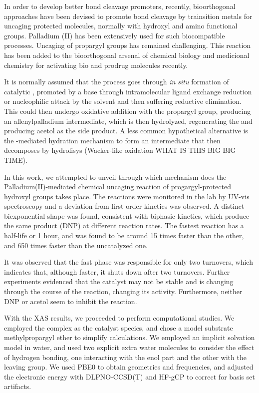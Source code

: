 In order to develop better  bond cleavage promoters,
recently, bioorthogonal approaches have been devised to promote  bond
cleavage by trainsition metals for uncaging protected molecules, normally with
hydroxyl and amino functional groups.
Palladium (II) has been extensively used for such biocompatible processes.
Uncaging of propargyl groups has remained challenging.
This reaction has been added to the bioorthogonal arsenal of chemical biology and
medicional chemistry for activating bio and prodrug molecules recently.

It is normally assumed that the process goes through \emph{in situ} formation
of catalytic , promoted by a base through intramolecular ligand exchange
reduction or nucleophilic attack by the solvent and then suffering reductive
elimination.
This  could then undergo oxidative addition with the
propargyl group, producing an allenylpalladium intermediate, which is then
hydrolyzed, regenerating the  and producing acetol as the side product.
A less common hypothetical alternative is the -mediated hydration
mechanism to form an intermediate that then decomposes by hydrolisys
(Wacker-like oxidation WHAT IS THIS BIG BIG TIME).

In this work, we attempted to unveil through which mechanism does
the Palladium(II)-mediated chemical uncaging reaction of
progargyl-protected hydroxyl groups takes place.
The reactions were monitored in the lab by UV-vis spectroscopy and a deviation
from first-order kinetics was observed.
A distinct biexponential shape was found, consistent with biphasic kinetics,
which produce the same product (DNP) at different reaction rates.
The fastest reaction has a half-life or 1 hour, and was found to be around 15 times faster than the other, and
650 times faster than the uncatalyzed one.

It was observed that the fast phase was responsible for only two turnovers,
which indicates that, although faster, it shuts down after two turnovers.
Further experiments evidenced that the catalyst may not be stable and is changing through the
course of the reaction, changing its activity.
Furthermore, neither DNP or acetol seem to inhibit the reaction.

With the XAS results, we proceeded to perform computational studies.
We employed the  complex as the catalyst species, and chose a
model substrate methylpropargyl ether to simplify calculations.
We employed an implicit solvation model in water, and used two explicit extra
water molecules to consider the effect of hydrogen bonding, one interacting
with the enol part and the other with the leaving group.
We used PBE0 to obtain geometries and frequencies, and adjusted the electronic
energy with DLPNO-CCSD(T) and HF-gCP to correct for basis set artifacts.

